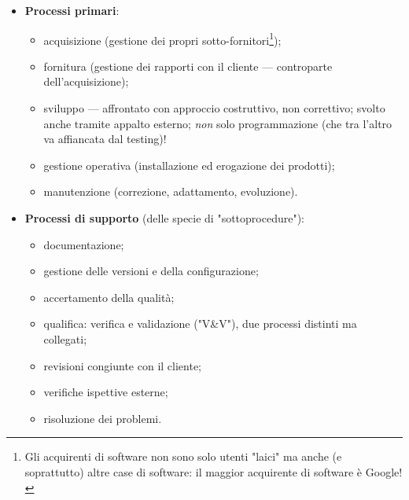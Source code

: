 \documentclass[a4paper]{article}
\begin{document}
	\begin{itemize}
		
			
	\item \textbf{Processi primari}:
				
	\begin{itemize}
		
					
	\item acquisizione (gestione dei propri sotto-fornitori\footnote{Gli acquirenti di software non sono solo utenti "laici" ma anche (e soprattutto) altre case di software: il maggior acquirente di software è Google!});
					
	\item fornitura (gestione dei rapporti con il cliente — controparte dell'acquisizione);
					
	\item sviluppo — affrontato con approccio costruttivo, non correttivo; svolto anche tramite appalto esterno; \emph{non} solo programmazione (che tra l'altro va affiancata dal testing)!
					
	\item gestione operativa (installazione ed erogazione dei prodotti);
					
	\item manutenzione (correzione, adattamento, evoluzione).
				
	\end{itemize}

			
			
	\item \textbf{Processi di supporto} (delle specie di "sottoprocedure"):
				
	\begin{itemize}
		
					
	\item documentazione;
					
	\item gestione delle versioni e della configurazione;
					
	\item accertamento della qualità;
					
	\item qualifica: verifica e validazione ("V\&{}V"), due processi distinti ma collegati;
					
	\item revisioni congiunte con il cliente;
					
	\item verifiche ispettive esterne;
					
	\item risoluzione dei problemi.
				

\end{itemize}
\end{itemize}
\end{document}
